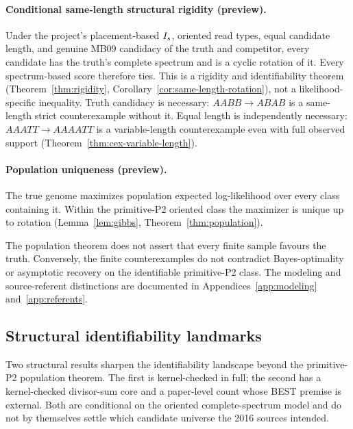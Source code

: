 \paragraph{Conditional same-length structural rigidity (preview).}
Under the project's placement-based $I_s$, oriented read types, equal
candidate length, and genuine MB09 candidacy of the truth and
competitor, every candidate has the truth's complete spectrum and is
a cyclic rotation of it. Every spectrum-based score therefore ties.
This is a rigidity and identifiability theorem
(Theorem~\ref{thm:rigidity}, Corollary~\ref{cor:same-length-rotation}),
not a likelihood-specific inequality. Truth candidacy is necessary:
$AABB\to ABAB$ is a same-length strict counterexample without it.
Equal length is independently necessary: $AAATT\to AAAATT$ is a
variable-length counterexample even with full observed support
(Theorem~\ref{thm:cex-variable-length}).

\paragraph{Population uniqueness (preview).}
The true genome maximizes population expected log-likelihood over
every class containing it. Within the primitive-P2 oriented class
the maximizer is unique up to rotation
(Lemma~\ref{lem:gibbs}, Theorem~\ref{thm:population}).

The population theorem does not assert that every finite sample favours
the truth. Conversely, the finite counterexamples do not contradict
Bayes-optimality or asymptotic recovery on the identifiable primitive-P2
class. The modeling and source-referent distinctions are documented in
Appendices~\ref{app:modeling} and~\ref{app:referents}.

\subsection{Structural identifiability landmarks}
\label{sec:structural-landmarks}

Two structural results sharpen the identifiability landscape beyond the
primitive-P2 population theorem. The first is kernel-checked in full; the
second has a kernel-checked divisor-sum core and a paper-level count whose
BEST premise is external. Both are conditional on the oriented
complete-spectrum model and do not by themselves settle which candidate
universe the 2016 sources intended.

